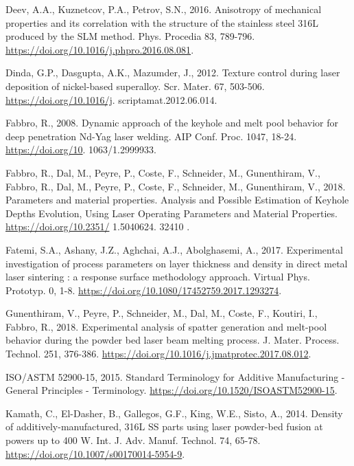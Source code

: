 \documentclass[10pt]{article}
\begin{document}
Deev, A.A., Kuznetcov, P.A., Petrov, S.N., 2016. Anisotropy of mechanical properties and its correlation with the structure of the stainless steel 316L produced by the SLM method. Phys. Procedia 83, 789-796. \href{https://doi.org/10.1016/j.phpro.2016.08.081}{https://doi.org/10.1016/j.phpro.2016.08.081}.

Dinda, G.P., Dasgupta, A.K., Mazumder, J., 2012. Texture control during laser deposition of nickel-based superalloy. Scr. Mater. 67, 503-506. \href{https://doi.org/10.1016/j}{https://doi.org/10.1016/j}. scriptamat.2012.06.014.

Fabbro, R., 2008. Dynamic approach of the keyhole and melt pool behavior for deep penetration Nd-Yag laser welding. AIP Conf. Proc. 1047, 18-24. \href{https://doi.org/10}{https://doi.org/10}. 1063/1.2999933.

Fabbro, R., Dal, M., Peyre, P., Coste, F., Schneider, M., Gunenthiram, V., Fabbro, R., Dal, M., Peyre, P., Coste, F., Schneider, M., Gunenthiram, V., 2018. Parameters and material properties. Analysis and Possible Estimation of Keyhole Depths Evolution, Using Laser Operating Parameters and Material Properties. \href{https://doi.org/10.2351/}{https://doi.org/10.2351/} 1.5040624. 32410 .

Fatemi, S.A., Ashany, J.Z., Aghchai, A.J., Abolghasemi, A., 2017. Experimental investigation of process parameters on layer thickness and density in direct metal laser sintering : a response surface methodology approach. Virtual Phys. Prototyp. 0, 1-8. \href{https://doi.org/10.1080/17452759.2017.1293274}{https://doi.org/10.1080/17452759.2017.1293274}.

Gunenthiram, V., Peyre, P., Schneider, M., Dal, M., Coste, F., Koutiri, I., Fabbro, R., 2018. Experimental analysis of spatter generation and melt-pool behavior during the powder bed laser beam melting process. J. Mater. Process. Technol. 251, 376-386. \href{https://doi.org/10.1016/j.jmatprotec.2017.08.012}{https://doi.org/10.1016/j.jmatprotec.2017.08.012}.

ISO/ASTM 52900-15, 2015. Standard Terminology for Additive Manufacturing - General Principles - Terminology. \href{https://doi.org/10.1520/ISOASTM52900-15}{https://doi.org/10.1520/ISOASTM52900-15}.

Kamath, C., El-Dasher, B., Gallegos, G.F., King, W.E., Sisto, A., 2014. Density of additively-manufactured, 316L SS parts using laser powder-bed fusion at powers up to 400 W. Int. J. Adv. Manuf. Technol. 74, 65-78. \href{https://doi.org/10.1007/s00170014-5954-9}{https://doi.org/10.1007/s00170014-5954-9}.
\end{document}
